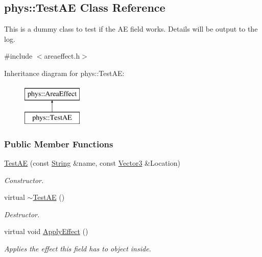 \hypertarget{classphys_1_1TestAE}{
\subsection{phys::TestAE Class Reference}
\label{classphys_1_1TestAE}
}


This is a dummy class to test if the AE field works. Details will be output to the log.  




{\ttfamily \#include $<$areaeffect.h$>$}

Inheritance diagram for phys::TestAE:\begin{figure}[H]
\begin{center}
\leavevmode
\includegraphics[height=2.000000cm]{classphys_1_1TestAE}
\end{center}
\end{figure}
\subsubsection*{Public Member Functions}
\begin{DoxyCompactItemize}
\item 
\hyperlink{classphys_1_1TestAE_ac3c760a899bbc3b55beb648245e49a21}{TestAE} (const \hyperlink{namespacephys_aa03900411993de7fbfec4789bc1d392e}{String} \&name, const \hyperlink{classphys_1_1Vector3}{Vector3} \&Location)
\begin{DoxyCompactList}\small\item\em Constructor. \item\end{DoxyCompactList}\item 
virtual \hyperlink{classphys_1_1TestAE_aa3ceb77df713b5cafa97495de61e4b0a}{$\sim$TestAE} ()
\begin{DoxyCompactList}\small\item\em Destructor. \item\end{DoxyCompactList}\item 
virtual void \hyperlink{classphys_1_1TestAE_a191c60dbfa277e850ea392d9ab774c42}{ApplyEffect} ()
\begin{DoxyCompactList}\small\item\em Applies the effect this field has to object inside. \item\end{DoxyCompactList}\end{DoxyCompactItemize}


